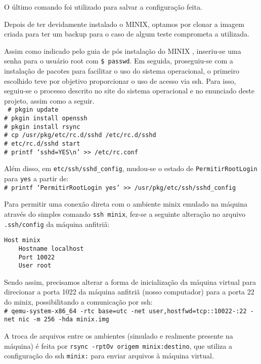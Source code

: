 \documentclass[12pt,journal,compsoc]{IEEEtran}
\begin{document}
O último comando foi utilizado para salvar a configuração feita.

Depois de ter devidamente instalado o MINIX, optamos por clonar a imagem criada para ter um backup para o caso de algum teste comprometa a utilizada.

Assim como indicado pelo guia de pós instalação do MINIX \cite{postInatalation:MINIX3}, inseriu-se uma senha para o usuário root com \texttt{\$ passwd}. Em seguida, proseguiu-se com a instalação de pacotes para facilitar o uso do sistema operacional, o primeiro escolhido teve por objetivo proporcionar o uso de acesso via ssh. Para isso, seguiu-se o processo descrito no site do sistema operacional\cite{installPackages:MINIX3} e no enunciado deste projeto, assim como a seguir.\\
\texttt{
\# pkgin update\\
\# pkgin install openssh\\
\# pkgin install rsync\\
\# cp /usr/pkg/etc/rc.d/sshd /etc/rc.d/sshd\\
\# etc/rc.d/sshd start\\
\# printf `sshd=YES\textbackslash n' >> /etc/rc.conf}

Além disso, em \texttt{etc/ssh/sshd\_config}, mudou-se o estado de \texttt{PermitirRootLogin} para \texttt{yes}\cite{sshConfig:github} a partir de:\\
\texttt{\# printf `PermitirRootLogin yes' >> /usr/pkg/etc/ssh/sshd\_config}

Para permitir uma conexão direta com o ambiente minix emulado na máquina através do simples comando \texttt{ssh minix}, fez-se a seguinte alteração no arquivo \texttt{.ssh/config} da máquina anfitriã:

\begin{verbatim}
Host minix
    Hostname localhost
    Port 10022
    User root
\end{verbatim}

Sendo assim, precisamos alterar a forma de inicialização da máquina virtual para direcionar a porta 1022 da máquina anfitriã (nosso computador) para a porta 22 do minix, possibilitando a comunicação por ssh:\\
\texttt{\# qemu-system-x86\_64 -rtc base=utc -net user,hostfwd=tcp::10022-:22 -net nic -m 256 -hda minix.img}

A troca de arquivos entre os ambientes (simulado e realmente presente na máquina) é feita por \texttt{rsync -rptOv origem minix:destino}, que utiliza a configuração do ssh \texttt{minix:} para enviar arquivos à máquina virtual\cite{rsyncUse:cobweb}.
\end{document}
